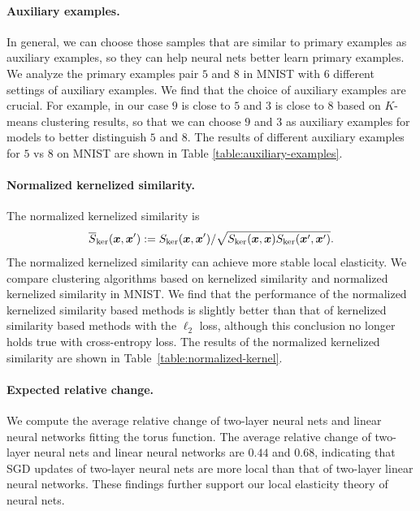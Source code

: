 \paragraph{Auxiliary examples.}
In general, we can choose those samples that are similar to primary examples as auxiliary examples, so they can help neural nets better learn primary examples. We analyze the primary examples pair $5$ and $8$ in MNIST with $6$ different settings of auxiliary examples. We find that the choice of auxiliary examples are crucial. For example, in our case $9$ is close to $5$ and $3$ is close to $8$ based on $K$-means clustering results, so that we can choose $9$ and $3$ as auxiliary examples for models to better distinguish $5$ and $8$. 
The results of different auxiliary examples for $5$ vs $8$ on MNIST are shown in Table \ref{table:auxiliary-examples}.

\paragraph{Normalized kernelized similarity.}
The normalized kernelized similarity is
\[
\overline{S}_{\mathrm{ker}}(\bm{x}, \bm{x}'):= S_{\mathrm{ker}}(\bm{x}, \bm{x}')/\sqrt{S_{\mathrm{ker}}(\bm{x}, \bm{x}) S_{\mathrm{ker}}(\bm{x}', \bm{x}')}.
\]
The normalized kernelized similarity can achieve more stable local elasticity. We compare clustering algorithms based on kernelized similarity and normalized kernelized similarity in MNIST. We find that the performance of the normalized kernelized similarity based methods is slightly better than that of kernelized similarity based methods with the $\ell_2$ loss, although this conclusion no longer holds true with cross-entropy loss. 
The results of the normalized kernelized similarity are shown in Table~\ref{table:normalized-kernel}.



\paragraph{Expected relative change.}
We compute the average relative change of two-layer neural nets and linear neural networks fitting the torus function. The average relative change of two-layer neural nets and linear neural networks are $0.44$ and $0.68$, indicating that SGD updates of two-layer neural nets are more local than that of two-layer linear neural networks. These findings further support our local elasticity theory of neural nets.

